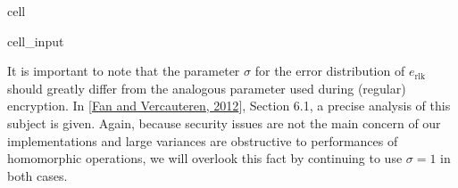 \documentclass[letterpaper,10pt,english]{jupyterBook}
\begin{document}
\begin{sphinxuseclass}{cell}\begin{sphinxVerbatimInput}

\begin{sphinxuseclass}{cell_input}
\begin{sphinxVerbatim}[commandchars=\\\{\}]
    
            
         
        
        
       
     \PYG{p}{[} \PYG{p}{]}
\end{sphinxVerbatim}

\end{sphinxuseclass}\end{sphinxVerbatimInput}

\end{sphinxuseclass}
\sphinxAtStartPar
It is important to note that the parameter \(\sigma\) for the error distribution of \(e_{\text{rlk}}\) should greatly differ from the analogous parameter used during (regular) encryption.
In {[}\hyperlink{cite.Thesis:id70}{Fan and Vercauteren, 2012}{]}, Section 6.1, a precise analysis of this subject is given.
Again, because security issues are not the main concern of our implementations and large variances are obstructive to performances of homomorphic operations, we will overlook this fact by continuing to use \(\sigma = 1\) in both cases.
\end{document}
